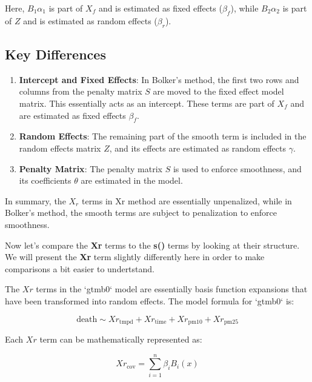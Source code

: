 Here, \(B_1 \alpha_1\) is part of \(X_f\) and is estimated as fixed effects (\(\beta_f\)), while \(B_2 \alpha_2\) is part of \(Z\) and is estimated as random effects (\(\beta_r\)).


\subsection{Key Differences}

\begin{enumerate}
    \item \textbf{Intercept and Fixed Effects}: In Bolker's method, the first two rows and columns from the penalty matrix \(S\) are moved to the fixed effect model matrix. This essentially acts as an intercept. These terms are part of \(X_f\) and are estimated as fixed effects \(\beta_f\).
    
    \item \textbf{Random Effects}: The remaining part of the smooth term is included in the random effects matrix \(Z\), and its effects are estimated as random effects \(\gamma\).
    
    \item \textbf{Penalty Matrix}: The penalty matrix \(S\) is used to enforce smoothness, and its coefficients \(\theta\) are estimated in the model.
\end{enumerate}





In summary, the \(X_r\) terms in Xr method are essentially unpenalized, while in Bolker's method, the smooth terms are subject to penalization to enforce smoothness.

Now let's compare the \textbf{Xr} terms to the \textbf{s()} terms by looking at their structure. We will present the \textbf{Xr} term slightly differently here in order to make comparisons a bit easier to undertstand. 
\newline

The \(Xr\) terms in the `gtmb0` model are essentially basis function expansions that have been transformed into random effects. The model formula for `gtmb0` is:

\[
\text{death} \sim Xr_{\text{tmpd}} + Xr_{\text{time}} + Xr_{\text{pm10}} + Xr_{\text{pm25}}
\]

Each \(Xr\) term can be mathematically represented as:

\begin{equation}
Xr_{\text{cov}} = \sum_{i=1}^{n} \beta_i B_i(x)
\end{equation}

